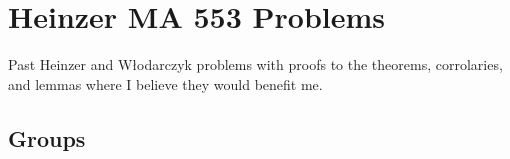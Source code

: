 \chapter{Heinzer MA 553 Problems}
Past Heinzer and Włodarczyk problems with proofs to the theorems,
corrolaries, and lemmas where I believe they would benefit me.
\section{Groups}


